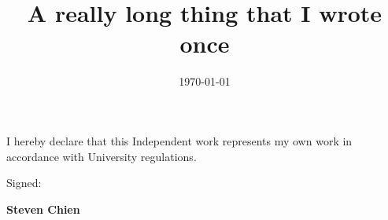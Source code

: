 \documentclass[letter, 11pt, oneside]{Thesis}  %
\begin{document}
\frontmatter      %

\title  {A really long thing that I wrote once}
\addresses  {\groupname\\\deptname\\\univname}  %
\date       {\today}
\subject    {}
\keywords   {}

\maketitle


\fancyhead{}  %
\rhead{\thepage}  %
\lhead{}  %


\pagestyle{empty}

\vspace*{\fill}

I hereby declare that this Independent work represents my own work in accordance with University regulations.
 
\hfill 
 
Signed: \hrulefill

\textbf{Steven Chien}

\clearpage  %


%
%
\end{document}
